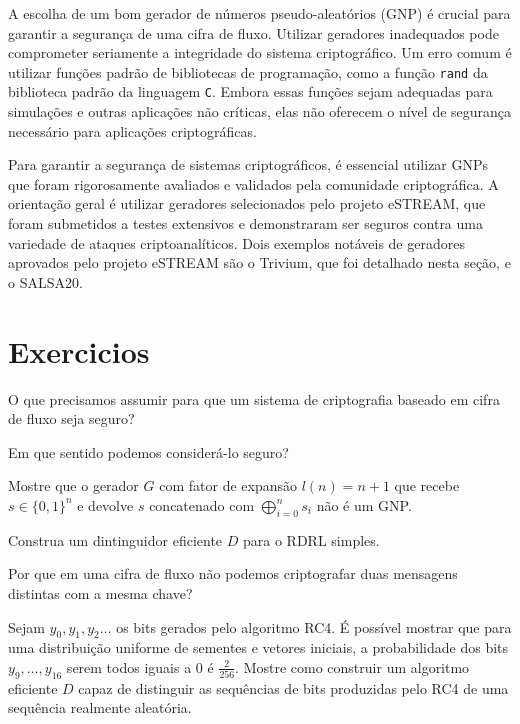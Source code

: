 A escolha de um bom gerador de números pseudo-aleatórios (GNP) é crucial para garantir a segurança de uma cifra de fluxo.
Utilizar geradores inadequados pode comprometer seriamente a integridade do sistema criptográfico.
Um erro comum é utilizar funções padrão de bibliotecas de programação, como a função \texttt{rand} da biblioteca padrão da linguagem \texttt{C}.
Embora essas funções sejam adequadas para simulações e outras aplicações não críticas, elas não oferecem o nível de segurança necessário para aplicações criptográficas.

Para garantir a segurança de sistemas criptográficos, é essencial utilizar GNPs que foram rigorosamente avaliados e validados pela comunidade criptográfica.
A orientação geral é utilizar geradores selecionados pelo projeto eSTREAM, que foram submetidos a testes extensivos e demonstraram ser seguros contra uma variedade de ataques criptoanalíticos.
Dois exemplos notáveis de geradores aprovados pelo projeto eSTREAM são o Trivium, que foi detalhado nesta seção, e o SALSA20.


\section{Exercicios}
\label{sec:exercicios}

\begin{exercicio}
  O que precisamos assumir para que um sistema de criptografia baseado em cifra de fluxo seja seguro?

  Em que sentido podemos considerá-lo seguro?
\end{exercicio}

\begin{exercicio}
Mostre que o gerador $G$ com fator de expansão $l(n) = n + 1$ que recebe $s \in \{0,1\}^n$ e devolve $s$ concatenado com $\bigoplus_{i=0}^ns_i$ não é um GNP.  
\end{exercicio}

\begin{exercicio}
  Construa um dintinguidor eficiente $D$ para o RDRL simples.
\end{exercicio}

\begin{exercicio}
  Por que em uma cifra de fluxo não podemos criptografar duas mensagens distintas com a mesma chave?
\end{exercicio}

\begin{exercicio}
 Sejam $y_0, y_1, y_2 \dots$ os bits gerados pelo algoritmo RC4.
É possível mostrar que para uma distribuição uniforme de sementes e vetores iniciais, a probabilidade dos bits $y_9, \dots, y_{16}$ serem todos iguais a $0$ é $\frac{2}{256}$.
Mostre como construir um algoritmo eficiente $D$ capaz de distinguir as sequências de bits produzidas pelo RC4 de uma sequência realmente aleatória.
\end{exercicio}

